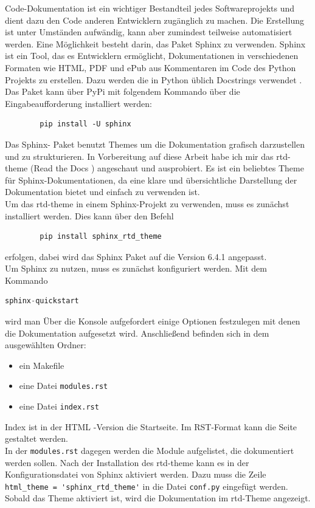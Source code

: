 Code-Dokumentation ist ein wichtiger Bestandteil jedes Softwareprojekts und dient dazu den Code anderen Entwicklern zugänglich zu machen.
Die Erstellung ist unter Umständen aufwändig, kann aber zumindest teilweise automatisiert werden.
Eine Möglichkeit besteht darin, das Paket Sphinx zu verwenden.
Sphinx ist ein Tool, das es Entwicklern ermöglicht, Dokumentationen in verschiedenen Formaten wie HTML, PDF und ePub
aus Kommentaren im Code des Python Projekts zu erstellen.
Dazu werden die in Python üblich Docstrings verwendet \cite{pepDocstrings}.\\
Das Paket kann über PyPi mit folgendem Kommando über die Eingabeaufforderung installiert werden:
\begin{lstlisting}
        pip install -U sphinx
\end{lstlisting}
\vspace{1cm}
Das Sphinx- Paket benutzt Themes um die Dokumentation grafisch darzustellen und zu strukturieren.
In Vorbereitung auf diese Arbeit habe ich mir das rtd-theme (Read the Docs \cite{RTD}) angeschaut und ausprobiert.
Es ist ein beliebtes Theme für Sphinx-Dokumentationen, da eine klare und übersichtliche Darstellung der Dokumentation
bietet und einfach zu verwenden ist. \\
Um das rtd-theme in einem Sphinx-Projekt zu verwenden, muss es zunächst installiert werden.
Dies kann über den Befehl
\begin{lstlisting}
        pip install sphinx_rtd_theme
\end{lstlisting}
erfolgen, dabei wird das Sphinx Paket auf die Version 6.4.1 angepasst.\\
\vspace{1cm}
Um Sphinx zu nutzen, muss es zunächst konfiguriert werden. Mit dem Kommando

\begin{lstlisting}[language = python]
        sphinx-quickstart
\end{lstlisting}
wird man Über die Konsole aufgefordert einige Optionen festzulegen mit denen die Dokumentation aufgesetzt wird.
Anschließend befinden sich in dem ausgewählten Ordner:
\begin{itemize}
        \item ein Makefile
        \item eine Datei \verb|modules.rst|
        \item eine Datei \verb|index.rst|
\end{itemize}

Index ist in der HTML -Version die Startseite.
Im RST-Format \cite{sphinxRST}kann die Seite gestaltet werden. \\
In der \verb|modules.rst| dagegen werden die Module aufgelistet, die dokumentiert werden sollen.
Nach der Installation des rtd-theme kann es in der Konfigurationsdatei von Sphinx aktiviert werden.
Dazu muss die Zeile \verb|html_theme = 'sphinx_rtd_theme'| in die Datei \verb|conf.py| eingefügt werden.
Sobald das Theme aktiviert ist, wird die Dokumentation im rtd-Theme angezeigt.\\


